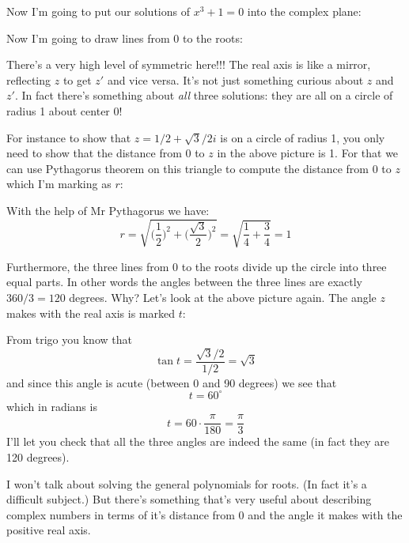 Now I'm going to put our solutions of $x^3 + 1 = 0$ into the complex
plane:


Now I'm going to draw lines from 0 to the roots:

There's a very high level of symmetric here!!!
The real axis is like a mirror, reflecting $z$ to get $z'$ 
and vice versa.
It's not just something curious about $z$ and $z'$.
In fact there's something about \textit{all} three solutions:
they are all on a circle of radius 1 about center 0!

For instance to show that $z = 1/2 + \sqrt{3}/2 i$ is on a circle
of radius 1, you only need to show that the distance from 0 to $z$
in the above picture is 1.
For that we can use Pythagorus theorem on this triangle
to compute the distance from 0 to $z$ which I'm marking as $r$:

With the help of Mr Pythagorus we have:
\[
r = \sqrt{\biggl( \frac{1}{2} \biggr)^2 + \biggl( \frac{\sqrt{3}}{2} \biggr)^2}
= \sqrt{\frac{1}{4} + \frac{3}{4}} = 1
\]




Furthermore, the three lines from 0 to the roots divide up the
circle into three equal parts.
In other words the angles between the three lines are exactly 
$360/3 = 120$ degrees.
Why?
Let's look at the above picture again.
The angle  $z$ makes with the real axis is marked $t$:

From trigo you know that
\[
\tan t = \frac{\sqrt{3}/2}{1/2} = \sqrt{3}
\]
and since this angle is acute (between 0 and 90 degrees)
we see that
\[
t = 60^\circ
\]
which in radians is
\[
t = 60 \cdot \frac{\pi}{180} = \frac{\pi}{3}
\]
I'll let you check that all the three angles are  indeed the same
(in fact they are 120 degrees).

I won't talk about solving the general polynomials for roots.
(In fact it's a difficult subject.)
But there's something that's very useful about describing
complex numbers in terms of it's distance from 0 and the angle it makes
with the positive real axis.

